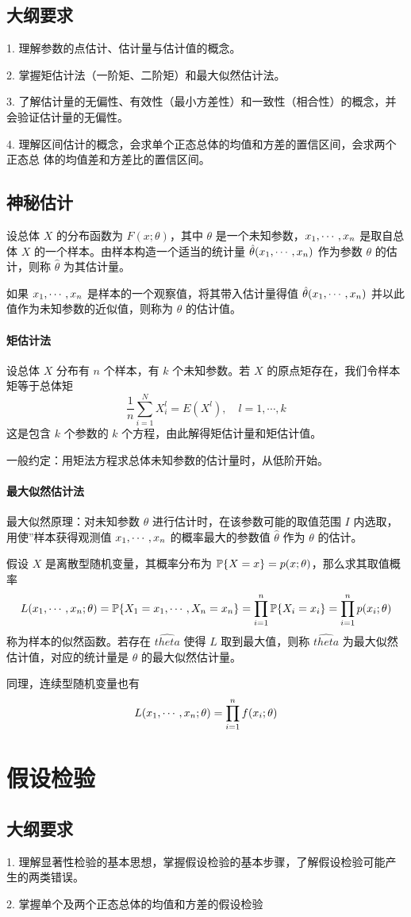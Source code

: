 \subsection{大纲要求}

1. 理解参数的点估计、估计量与估计值的概念。

2. 掌握矩估计法（一阶矩、二阶矩）和最大似然估计法。

3. 了解估计量的无偏性、有效性（最小方差性）和一致性（相合性）的概念，并会验证估计量的无偏性。

4. 理解区间估计的概念，会求单个正态总体的均值和方差的置信区间，会求两个正态总
体的均值差和方差比的置信区间。

\subsection{神秘估计}

设总体 $X$ 的分布函数为 $F(x; \theta)$，其中 $\theta$ 是一个未知参数，$x_1,\cdots,x_n$ 是取自总体 $X$ 的一个样本。由样本构造一个适当的统计量 $\hat{\theta}(x_1,\cdots,x_n)$ 作为参数 $\theta$ 的估计，则称 $\hat{\theta}$ 为其估计量。

如果 $x_1,\cdots,x_n$ 是样本的一个观察值，将其带入估计量得值 $\hat{\theta}(x_1,\cdots,x_n)$ 并以此值作为未知参数的近似值，则称为 $\theta$ 的估计值。

\paragraph{矩估计法}

设总体 $X$ 分布有 $n$ 个样本，有 $k$ 个未知参数。若 $X$ 的原点矩存在，我们令样本矩等于总体矩
\[ \frac{1}{n} \sum_{i=1}^{N} X_i^l = E(X^l), \quad l = 1, \cdots, k \]
这是包含 $k$ 个参数的 $k$ 个方程，由此解得矩估计量和矩估计值。

一般约定：用矩法方程求总体未知参数的估计量时，从低阶开始。

\paragraph{最大似然估计法}

最大似然原理：对未知参数 $\theta$ 进行估计时，在该参数可能的取值范围 $I$ 内选取，用使”样本获得观测值 $x_1,\cdots,x_n$ 的概率最大的参数值 $\hat{\theta}$ 作为 $\theta$ 的估计。

假设 $X$ 是离散型随机变量，其概率分布为 $\mathbb{P}\{X = x\} = p(x; \theta)$，那么求其取值概率
\[ L(x_1,\cdots,x_n;\theta) = \mathbb{P}\{X_1 = x_1, \cdots, X_n = x_n\} = \prod_{i=1}^n \mathbb{P}\{X_i=x_i\} = \prod_{i=1}^n p(x_i; \theta) \]
称为样本的似然函数。若存在 $\hat{theta}$ 使得 $L$ 取到最大值，则称 $\hat{theta}$ 为最大似然估计值，对应的统计量是 $\theta$ 的最大似然估计量。

同理，连续型随机变量也有
\[ L(x_1,\cdots,x_n; \theta) = \prod_{i=1}^n f(x_i; \theta) \]


\section{假设检验}

\subsection{大纲要求}

1. 理解显著性检验的基本思想，掌握假设检验的基本步骤，了解假设检验可能产生的两类错误。

2. 掌握单个及两个正态总体的均值和方差的假设检验
